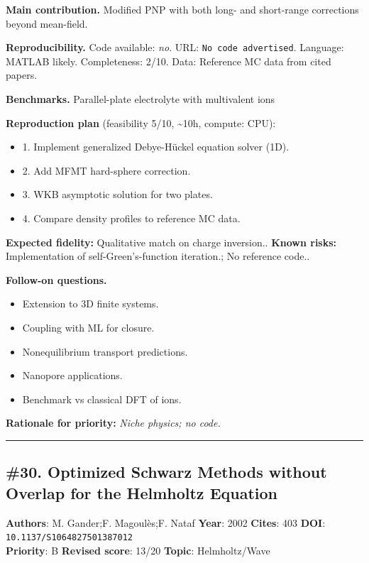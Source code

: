 \documentclass[10pt,letterpaper]{article}
\begin{document}
\textbf{Main contribution.} Modified PNP with both long- and short-range corrections beyond mean-field.

\textbf{Reproducibility.} Code available: \emph{no}. URL: \texttt{No code advertised}. Language: MATLAB likely. Completeness: 2/10. Data: Reference MC data from cited papers.

\textbf{Benchmarks.} Parallel-plate electrolyte with multivalent ions

\textbf{Reproduction plan} (feasibility 5/10, \textasciitilde10h, compute: CPU):
\begin{itemize}
\item 1. Implement generalized Debye-Hückel equation solver (1D).
\item 2. Add MFMT hard-sphere correction.
\item 3. WKB asymptotic solution for two plates.
\item 4. Compare density profiles to reference MC data.
\end{itemize}
\textbf{Expected fidelity:} Qualitative match on charge inversion.. \textbf{Known risks:} Implementation of self-Green's-function iteration.; No reference code..

\textbf{Follow-on questions.}
\begin{itemize}
\item Extension to 3D finite systems.
\item Coupling with ML for closure.
\item Nonequilibrium transport predictions.
\item Nanopore applications.
\item Benchmark vs classical DFT of ions.
\end{itemize}

\textbf{Rationale for priority:} \emph{Niche physics; no code.}

\medskip\hrule\medskip

\subsection*{\#30. Optimized Schwarz Methods without Overlap for the Helmholtz Equation}
\textbf{Authors}: M. Gander;F. Magoulès;F. Nataf \textbullet{} \textbf{Year}: 2002 \textbullet{} \textbf{Cites}: 403 \textbullet{} \textbf{DOI}: \texttt{10.1137/S1064827501387012} \\
\textbf{Priority}: B \textbullet{} \textbf{Revised score}: 13/20 \textbullet{} \textbf{Topic}: Helmholtz/Wave
\end{document}
